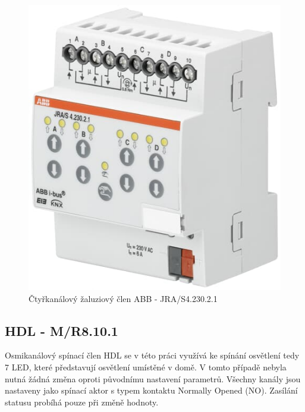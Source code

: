 \begin{figure}[!ht]
  \begin{center}
    \includegraphics[scale=0.25]{obrazky/ABB aktor2.jpg}
  \end{center}
  \caption[Čtyřkanálový žaluziový člen ABB - JRA/S4.230.2.1 \cite{ABB aktor2}]{Čtyřkanálový žaluziový člen ABB - JRA/S4.230.2.1  \cite{ABB aktor2}}
  \label{fig:Čtyřkanálový žaluziový člen ABB - JRA/S4.230.2.1}
\end{figure}

\subsection{HDL - M/R8.10.1}
Osmikanálový spínací člen HDL se v této práci využívá ke spínání osvětlení tedy 7 LED, které představují osvětlení umístěné v domě. V tomto případě nebyla nutná žádná změna oproti původnímu nastavení parametrů. Všechny kanály jsou nastaveny jako spínací aktor s typem kontaktu Normally Opened (NO). Zasílání statusu probíhá pouze při změně hodnoty.

